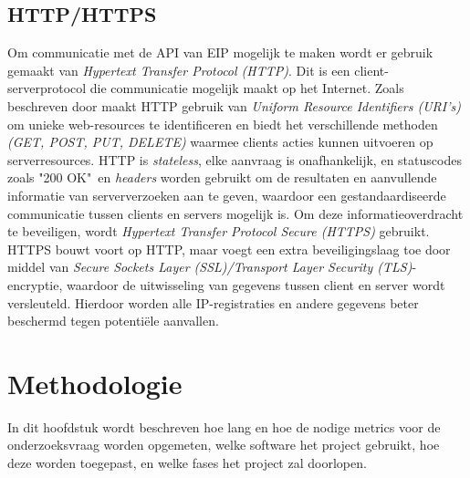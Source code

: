 \subsection{HTTP/HTTPS}
Om communicatie met de API van EIP mogelijk te maken wordt er gebruik gemaakt van \textit{Hypertext Transfer Protocol (HTTP)}. Dit is een client-serverprotocol die communicatie mogelijk maakt op het Internet. Zoals beschreven door \textcite{Fielding2014} maakt HTTP gebruik van \textit{Uniform Resource Identifiers (URI's)} om unieke web-resources te identificeren en biedt het verschillende methoden \textit{(GET, POST, PUT, DELETE)} waarmee clients acties kunnen uitvoeren op serverresources. HTTP is \textit{stateless}, elke aanvraag is onafhankelijk, en statuscodes zoals "200 OK"\ en \textit{headers} worden gebruikt om de resultaten en aanvullende informatie van serververzoeken aan te geven, waardoor een gestandaardiseerde communicatie tussen clients en servers mogelijk is.
Om deze informatieoverdracht te beveiligen, wordt \textit{Hypertext Transfer Protocol Secure (HTTPS)} gebruikt. HTTPS bouwt voort op HTTP, maar voegt een extra beveiligingslaag toe door middel van \textit{Secure Sockets Layer (SSL)/Transport Layer Security (TLS)}-encryptie, waardoor de uitwisseling van gegevens tussen client en server wordt versleuteld. Hierdoor worden alle IP-registraties en andere gegevens beter beschermd tegen potentiële aanvallen.

\section{Methodologie}
\label{sec:methodologie}
In dit hoofdstuk wordt beschreven hoe lang en hoe de nodige metrics voor de onderzoeksvraag worden opgemeten, welke software het project gebruikt, hoe deze worden toegepast, en welke fases het project zal doorlopen.

